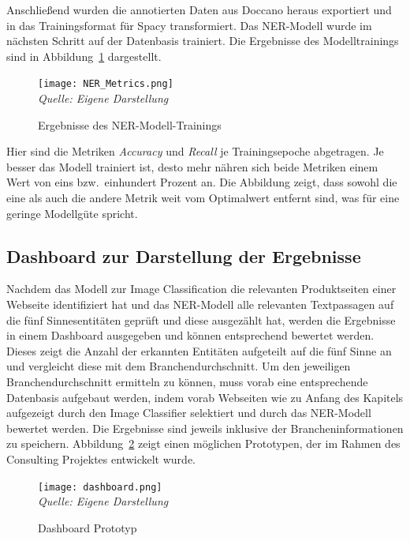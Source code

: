 Anschließend wurden die annotierten Daten aus Doccano heraus exportiert und in das Trainingsformat für Spacy transformiert.
Das \ac{NER}-Modell wurde im nächsten Schritt auf der Datenbasis trainiert.
Die Ergebnisse des Modelltrainings sind in Abbildung~\ref{fig:NER_Metrics} dargestellt.

\begin{figure}[H]
	\centering
	\caption[]{Ergebnisse des NER-Modell-Trainings}\label{fig:NER_Metrics}
	\texttt{[image: NER\_Metrics.png]}
	\\
	\textit{Quelle: Eigene Darstellung}
\end{figure}

Hier sind die Metriken \textit{Accuracy} und \textit{Recall} je Trainingsepoche abgetragen.
Je besser das Modell trainiert ist, desto mehr nähren sich beide Metriken einem Wert von eins bzw.\ einhundert Prozent an.
Die Abbildung zeigt, dass sowohl die eine als auch die andere Metrik weit vom Optimalwert entfernt sind, was für eine
geringe Modellgüte spricht.

\subsection{Dashboard zur Darstellung der Ergebnisse}\label{subsec_dashboard}
Nachdem das Modell zur Image Classification die relevanten Produktseiten einer Webseite identifiziert hat und das \ac{NER}-Modell
alle relevanten Textpassagen auf die fünf Sinnesentitäten geprüft und diese ausgezählt hat, werden die Ergebnisse
in einem Dashboard ausgegeben und können entsprechend bewertet werden.
Dieses zeigt die Anzahl der erkannten Entitäten aufgeteilt auf die fünf Sinne an und vergleicht diese mit dem Branchendurchschnitt.
Um den jeweiligen Branchendurchschnitt ermitteln zu können, muss vorab eine entsprechende Datenbasis aufgebaut werden,
indem vorab Webseiten wie zu Anfang des Kapitels aufgezeigt durch den Image Classifier selektiert und durch das \ac{NER}-Modell
bewertet werden.
Die Ergebnisse sind jeweils inklusive der Brancheninformationen zu speichern.
Abbildung~\ref{fig:dashboard} zeigt einen möglichen Prototypen, der im Rahmen des Consulting Projektes entwickelt wurde.
\begin{figure}[H]
	\centering
	\caption[]{Dashboard Prototyp}\label{fig:dashboard}
	\texttt{[image: dashboard.png]}
	\\
	\textit{Quelle: Eigene Darstellung}
\end{figure}